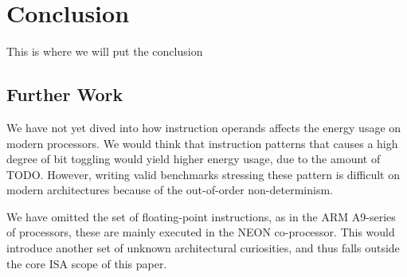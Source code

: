 \section{Conclusion}
This is where we will put the conclusion

\subsection{Further Work}

We have not yet dived into how instruction operands affects the energy usage on
modern processors. We would think that instruction patterns that causes a high
degree of bit toggling would yield higher energy usage, due to the amount of
TODO. However, writing valid benchmarks stressing these pattern is difficult on
modern architectures because of the out-of-order non-determinism.

We have omitted the set of floating-point instructions, as in the ARM A9-series
of processors, these are mainly executed in the NEON co-processor. This would
introduce another set of unknown architectural curiosities\cite{wolf}, and thus falls
outside the core ISA scope of this paper.
